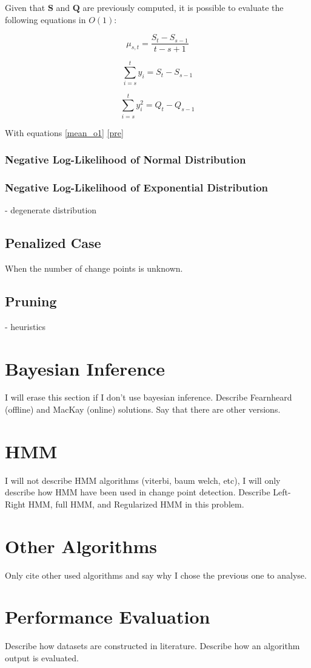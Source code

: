 Given that $\mathbf{S}$ and $\mathbf{Q}$ are previously computed, it is possible to evaluate the following equations in $O(1)$: 

\begin{equation}
    \label{mean_o1}
    \mu_{s, t} = \frac{S_{t} - S_{s - 1}}{t - s + 1}
\end{equation}

\begin{equation}
    \label{prefixsum1_o1}
    \sum \limits_{i = s}^{t} y_{i} = S_{t} - S_{s - 1}
\end{equation}

\begin{equation}
    \label{prefixsum2_o1}
    \sum \limits_{i = s}^{t} y_{i}^{2} = Q_{t} - Q_{s - 1}
\end{equation}

With equations \ref{mean_o1} \ref{pre}

\subsubsection{Negative Log-Likelihood of Normal Distribution}
\subsubsection{Negative Log-Likelihood of Exponential Distribution}

- degenerate distribution

\subsection{Penalized Case}

When the number of change points is unknown.

\subsection{Pruning}
- heuristics

\section{Bayesian Inference}
I will erase this section if I don't use bayesian inference. Describe Fearnheard (offline) and MacKay (online) solutions. Say that there are other versions.

\section{HMM}
I will not describe HMM algorithms (viterbi, baum welch, etc), I will only describe how HMM have been used in change point detection. Describe Left-Right HMM, full HMM, and Regularized HMM in this problem.

\section{Other Algorithms}
Only cite other used algorithms and say why I chose the previous one to analyse.

\section{Performance Evaluation}
  Describe how datasets are constructed in literature. Describe how an algorithm output is evaluated.

